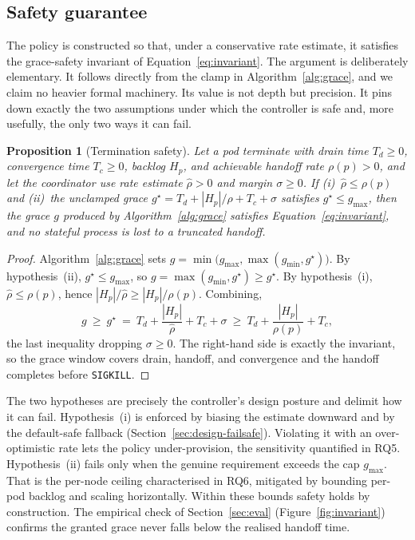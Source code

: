 \documentclass[AMA,Times1COL]{WileyNJDv5}
\newtheorem{gcprop}{Proposition}
\begin{document}
\subsection{Safety guarantee}\label{sec:design-safety}

The policy is constructed so that, under a conservative rate estimate, it satisfies the grace-safety
invariant of Equation~\eqref{eq:invariant}. The argument is deliberately elementary. It follows
directly from the clamp in Algorithm~\ref{alg:grace}, and we claim no heavier formal machinery. Its
value is not depth but precision. It pins down exactly the two assumptions under which the controller
is safe and, more usefully, the only two ways it can fail.

\begin{gcprop}[Termination safety]\label{prop:safety}
Let a pod terminate with drain time $T_d\ge 0$, convergence time $T_c\ge 0$, backlog $H_p$, and
achievable handoff rate $\rho(p)>0$, and let the coordinator use rate estimate $\hat\rho>0$ and
margin $\sigma\ge 0$. If \emph{(i)}~$\hat\rho\le\rho(p)$ and \emph{(ii)}~the unclamped grace
$g^\star=T_d+|H_p|/\hat\rho+T_c+\sigma$ satisfies $g^\star\le g_{\max}$, then the grace $g$ produced by
Algorithm~\ref{alg:grace} satisfies Equation~\eqref{eq:invariant}, and no stateful process is lost to
a truncated handoff.
\end{gcprop}

\begin{proof}
Algorithm~\ref{alg:grace} sets $g=\min\!\big(g_{\max},\max(g_{\min},g^\star)\big)$. By hypothesis~(ii),
$g^\star\le g_{\max}$, so $g=\max(g_{\min},g^\star)\ge g^\star$. By hypothesis~(i),
$\hat\rho\le\rho(p)$, hence $|H_p|/\hat\rho\ge|H_p|/\rho(p)$. Combining,
\[
  g\ \ge\ g^\star\ =\ T_d+\frac{|H_p|}{\hat\rho}+T_c+\sigma
   \ \ge\ T_d+\frac{|H_p|}{\rho(p)}+T_c ,
\]
the last inequality dropping $\sigma\ge 0$. The right-hand side is exactly the invariant, so the
grace window covers drain, handoff, and convergence and the handoff completes before \texttt{SIGKILL}.
\end{proof}

The two hypotheses are precisely the controller's design posture and delimit how it can fail.
Hypothesis~(i) is enforced by biasing the estimate downward and by the default-safe fallback
(Section~\ref{sec:design-failsafe}). Violating it with an over-optimistic rate lets the policy
under-provision, the sensitivity quantified in RQ5. Hypothesis~(ii) fails only when the genuine
requirement exceeds the cap $g_{\max}$. That is the per-node ceiling characterised in RQ6, mitigated
by bounding per-pod backlog and scaling horizontally. Within these bounds safety holds by
construction. The empirical check of Section~\ref{sec:eval} (Figure~\ref{fig:invariant}) confirms
the granted grace never falls below the realised handoff time.
\end{document}
